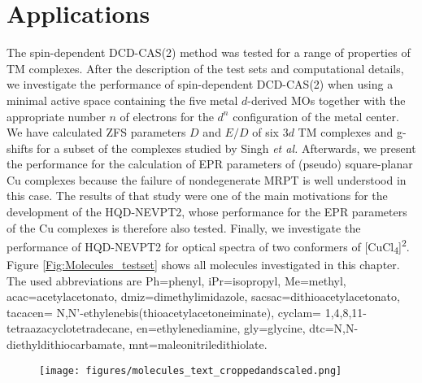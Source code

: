 \chapter{Applications}
The spin-dependent DCD-CAS(2) method was tested for a range of properties of TM complexes.\cite{LangN_2019_104104} After the description of the test sets and computational details, we investigate the performance of spin-dependent DCD-CAS(2) when using a minimal active space containing the five metal $d$-derived MOs together with the appropriate number $n$ of electrons for the $d^n$ configuration of the metal center. We have calculated ZFS parameters $D$ and $E/D$ of six $3d$ TM complexes and g-shifts for a subset of the complexes studied by Singh \textit{et al.}\cite{SinghAN_2018_4662} Afterwards, we present the performance for the calculation of EPR parameters of (pseudo) square-planar Cu complexes because the failure of nondegenerate MRPT is well understood in this case. The results of that study were one of the main motivations for the development of the HQD-NEVPT2, whose performance for the EPR parameters of the Cu complexes is therefore also tested. Finally, we investigate the performance of HQD-NEVPT2 for optical spectra of two conformers of [CuCl\textsubscript{4}]\textsuperscript{2\textminus}. Figure \ref{Fig:Molecules_testset} shows all molecules investigated in this chapter. The used abbreviations are Ph=phenyl, iPr=isopropyl, Me=methyl, acac=acetylacetonato, dmiz=dimethylimidazole, sacsac=dithioacetylacetonato, tacacen= N,N'-ethylenebis(thioacetylacetoneiminate), cyclam= 1,4,8,11-tetra\-aza\-cyclo\-tetra\-decane,  en=ethylenediamine, gly=glycine, dtc=N,N-di\-ethyl\-di\-thio\-carba\-mate, mnt=ma\-leo\-nitrile\-di\-thio\-late.
\begin{figure}
{\texttt{[image: figures/molecules\_text\_croppedandscaled.png]}}
\end{figure}

